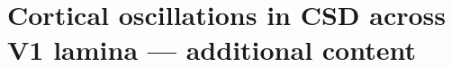 \chapter{Cortical oscillations in CSD across V1 lamina --- additional content}
\label{ch:xlam}

\graphicspath{{Chapters/laminar-extra/figs/}}

